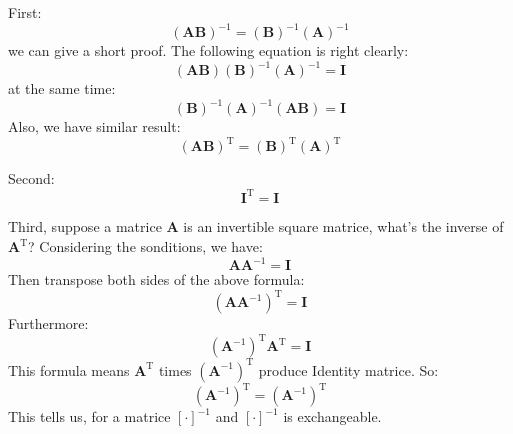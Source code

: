         First:
            \begin{equation}
                (\mathbf{A} \mathbf{B})^{-1} = ( \mathbf{B})^{-1} (\mathbf{A})^{-1}
            \end{equation}
        we can give a short proof. The following equation is right clearly:
            \begin{equation}
                (\mathbf{A} \mathbf{B})( \mathbf{B})^{-1} (\mathbf{A})^{-1} = \mathbf{I}
            \end{equation}
        at the same time:
            \begin{equation}
                ( \mathbf{B})^{-1} (\mathbf{A})^{-1} (\mathbf{A} \mathbf{B}) = \mathbf{I}
            \end{equation}
        Also, we have similar result:
            \begin{equation}
                (\mathbf{A} \mathbf{B})^{\mathrm{T}} = ( \mathbf{B})^{\mathrm{T}} (\mathbf{A})^{\mathrm{T}}
            \end{equation}
        
        Second:
            \begin{equation}
                \mathbf{I}^{\mathrm{T}} = \mathbf{I}
            \end{equation}
        
        Third, suppose a matrice \textbf{A} is an invertible square matrice, what's the inverse of $\mathbf{A}^{\mathrm{T}}$?
        Considering the sonditions, we have:
            \begin{equation}
                \mathbf{A} \mathbf{A}^{-1} = \mathbf{I}
            \end{equation}
        Then transpose both sides of the above formula:
            \begin{equation}
                (\mathbf{A} \mathbf{A}^{-1})^{\mathrm{T}} = \mathbf{I}
            \end{equation}
        Furthermore:
            \begin{equation}
                 (\mathbf{A}^{-1})^{\mathrm{T}} \mathbf{A}^{\mathrm{T}} = \mathbf{I}
            \end{equation}
        This formula means $\mathbf{A}^\mathrm{T}$ times  $(\mathbf{A}^{-1})^{\mathrm{T}}$ produce Identity matrice.
        So:
            \begin{equation}
                 (\mathbf{A}^{-1})^{\mathrm{T}} = (\mathbf{A}^{\mathrm{-1}})^{\mathrm{T}}
            \end{equation}
        This tells us, for a matrice $[\cdot]^{-1}$ and $[\cdot]^{-1}$ is exchangeable.

